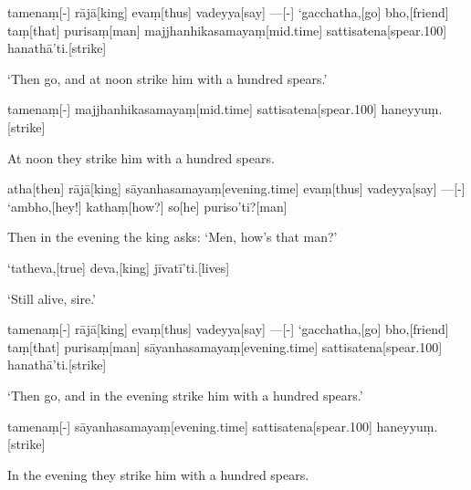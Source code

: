 \begin{samepage}
\begingl[glneveryline={\PaliGlossA,\PaliGlossB}]
tamenaṃ[-] rājā[king] evaṃ[thus] vadeyya[say] —[-] ‘gacchatha,[go] bho,[friend] taṃ[that] purisaṃ[man] majjhanhikasamayaṃ[mid.time] sattisatena[spear.100] hanathā’ti.[strike]
\endgl
\nopagebreak
\linespread{0.5}
\begin{spacin}{0.2}
{\PaliGlossFT ‘Then go, and at noon strike him with a hundred spears.’}
\end{spacin}
\vskip 12pt
\end{samepage}
\begin{samepage}
\begingl[glneveryline={\PaliGlossA,\PaliGlossB}]
tamenaṃ[-] majjhanhikasamayaṃ[mid.time] sattisatena[spear.100] haneyyuṃ.[strike]
\endgl
\nopagebreak
\linespread{0.5}
\begin{spacin}{0.2}
{\PaliGlossFT At noon they strike him with a hundred spears.}
\end{spacin}
\vskip 12pt
\end{samepage}
\begin{samepage}
\begingl[glneveryline={\PaliGlossA,\PaliGlossB}]
atha[then] rājā[king] sāyanhasamayaṃ[evening.time] evaṃ[thus] vadeyya[say] —[-] ‘ambho,[hey!] kathaṃ[how?] so[he] puriso’ti?[man]
\endgl
\nopagebreak
\linespread{0.5}
\begin{spacin}{0.2}
{\PaliGlossFT Then in the evening the king asks: ‘Men, how’s that man?’}
\end{spacin}
\vskip 12pt
\end{samepage}
\begin{samepage}
\begingl[glneveryline={\PaliGlossA,\PaliGlossB}]
‘tatheva,[true] deva,[king] jīvatī’ti.[lives]
\endgl
\nopagebreak
\linespread{0.5}
\begin{spacin}{0.2}
{\PaliGlossFT ‘Still alive, sire.’}
\end{spacin}
\vskip 12pt
\end{samepage}
\begin{samepage}
\begingl[glneveryline={\PaliGlossA,\PaliGlossB}]
tamenaṃ[-] rājā[king] evaṃ[thus] vadeyya[say] —[-] ‘gacchatha,[go] bho,[friend] taṃ[that] purisaṃ[man] sāyanhasamayaṃ[evening.time] sattisatena[spear.100] hanathā’ti.[strike]
\endgl
\nopagebreak
\linespread{0.5}
\begin{spacin}{0.2}
{\PaliGlossFT ‘Then go, and in the evening strike him with a hundred spears.’}
\end{spacin}
\vskip 12pt
\end{samepage}
\begin{samepage}
\begingl[glneveryline={\PaliGlossA,\PaliGlossB}]
tamenaṃ[-] sāyanhasamayaṃ[evening.time] sattisatena[spear.100] haneyyuṃ.[strike]
\endgl
\nopagebreak
\linespread{0.5}
\begin{spacin}{0.2}
{\PaliGlossFT In the evening they strike him with a hundred spears.}
\end{spacin}
\vskip 12pt
\end{samepage}
